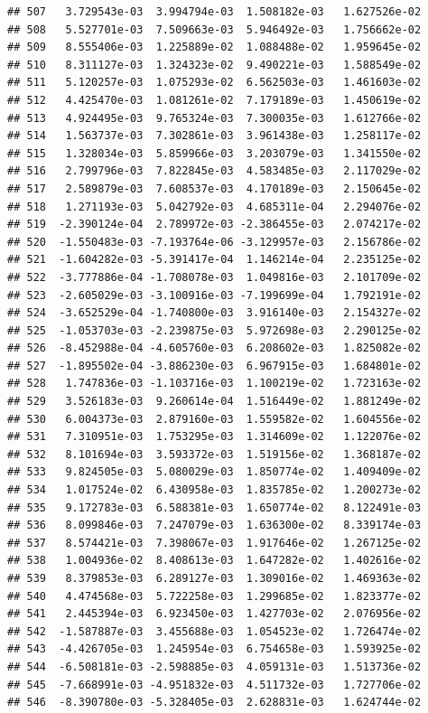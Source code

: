 \documentclass[
]{article}
\begin{document}
\begin{verbatim}
## 507   3.729543e-03  3.994794e-03  1.508182e-03   1.627526e-02
## 508   5.527701e-03  7.509663e-03  5.946492e-03   1.756662e-02
## 509   8.555406e-03  1.225889e-02  1.088488e-02   1.959645e-02
## 510   8.311127e-03  1.324323e-02  9.490221e-03   1.588549e-02
## 511   5.120257e-03  1.075293e-02  6.562503e-03   1.461603e-02
## 512   4.425470e-03  1.081261e-02  7.179189e-03   1.450619e-02
## 513   4.924495e-03  9.765324e-03  7.300035e-03   1.612766e-02
## 514   1.563737e-03  7.302861e-03  3.961438e-03   1.258117e-02
## 515   1.328034e-03  5.859966e-03  3.203079e-03   1.341550e-02
## 516   2.799796e-03  7.822845e-03  4.583485e-03   2.117029e-02
## 517   2.589879e-03  7.608537e-03  4.170189e-03   2.150645e-02
## 518   1.271193e-03  5.042792e-03  4.685311e-04   2.294076e-02
## 519  -2.390124e-04  2.789972e-03 -2.386455e-03   2.074217e-02
## 520  -1.550483e-03 -7.193764e-06 -3.129957e-03   2.156786e-02
## 521  -1.604282e-03 -5.391417e-04  1.146214e-04   2.235125e-02
## 522  -3.777886e-04 -1.708078e-03  1.049816e-03   2.101709e-02
## 523  -2.605029e-03 -3.100916e-03 -7.199699e-04   1.792191e-02
## 524  -3.652529e-04 -1.740800e-03  3.916140e-03   2.154327e-02
## 525  -1.053703e-03 -2.239875e-03  5.972698e-03   2.290125e-02
## 526  -8.452988e-04 -4.605760e-03  6.208602e-03   1.825082e-02
## 527  -1.895502e-04 -3.886230e-03  6.967915e-03   1.684801e-02
## 528   1.747836e-03 -1.103716e-03  1.100219e-02   1.723163e-02
## 529   3.526183e-03  9.260614e-04  1.516449e-02   1.881249e-02
## 530   6.004373e-03  2.879160e-03  1.559582e-02   1.604556e-02
## 531   7.310951e-03  1.753295e-03  1.314609e-02   1.122076e-02
## 532   8.101694e-03  3.593372e-03  1.519156e-02   1.368187e-02
## 533   9.824505e-03  5.080029e-03  1.850774e-02   1.409409e-02
## 534   1.017524e-02  6.430958e-03  1.835785e-02   1.200273e-02
## 535   9.172783e-03  6.588381e-03  1.650774e-02   8.122491e-03
## 536   8.099846e-03  7.247079e-03  1.636300e-02   8.339174e-03
## 537   8.574421e-03  7.398067e-03  1.917646e-02   1.267125e-02
## 538   1.004936e-02  8.408613e-03  1.647282e-02   1.402616e-02
## 539   8.379853e-03  6.289127e-03  1.309016e-02   1.469363e-02
## 540   4.474568e-03  5.722258e-03  1.299685e-02   1.823377e-02
## 541   2.445394e-03  6.923450e-03  1.427703e-02   2.076956e-02
## 542  -1.587887e-03  3.455688e-03  1.054523e-02   1.726474e-02
## 543  -4.426705e-03  1.245954e-03  6.754658e-03   1.593925e-02
## 544  -6.508181e-03 -2.598885e-03  4.059131e-03   1.513736e-02
## 545  -7.668991e-03 -4.951832e-03  4.511732e-03   1.727706e-02
## 546  -8.390780e-03 -5.328405e-03  2.628831e-03   1.624744e-02

\end{verbatim}
\end{document}
